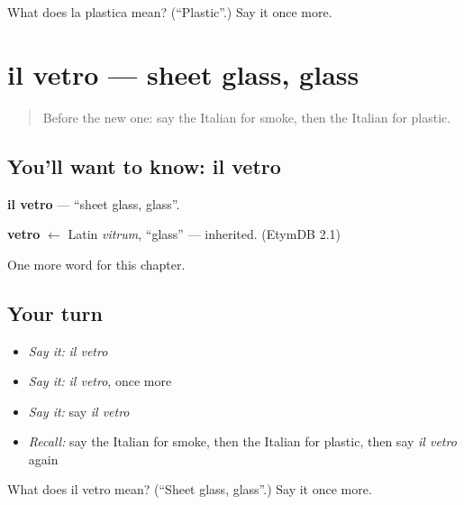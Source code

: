 \begin{tcolorbox}[breakable,colback=teal!4,colframe=teal!35!black,title={Before you move on}]
What does la plastica mean? (\textquotedblleft{}Plastic\textquotedblright{}.) Say it once more.
\end{tcolorbox}
\section[il vetro]{il vetro — sheet glass, glass}

\label{lesson:IT-C230-vetro}



\begin{quote}
Before the new one: say the Italian for smoke, then the Italian for plastic.
\end{quote}

\subsection*{You'll want to know: il vetro}
\textbf{il vetro} — \textquotedblleft{}sheet glass, glass\textquotedblright{}.

\begin{cousinweb}
\textbf{vetro} $\leftarrow$ Latin \emph{vitrum}, \textquotedblleft{}glass\textquotedblright{} — inherited. (EtymDB 2.1)
\end{cousinweb}

\begin{grammarlens}[title={What you've built}]
One more word for this chapter.
\end{grammarlens}

\subsection*{Your turn}
\begin{itemize}
\raggedright
  \item \emph{Say it:} \emph{il vetro}
  \item \emph{Say it:} \emph{il vetro}, once more
  \item \emph{Say it:} say \emph{il vetro}
  \item \emph{Recall:} say the Italian for smoke, then the Italian for plastic, then say \emph{il vetro} again
\end{itemize}

\begin{tcolorbox}[breakable,colback=teal!4,colframe=teal!35!black,title={Before you move on}]
What does il vetro mean? (\textquotedblleft{}Sheet glass, glass\textquotedblright{}.) Say it once more.
\end{tcolorbox}
